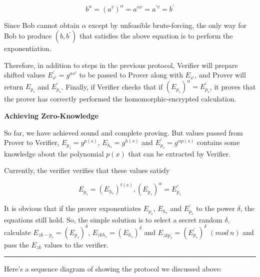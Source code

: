\documentclass[
]{report}
\begin{document}
\[b^{\alpha} = \left( a^{v} \right)^{\alpha} = a^{\alpha v} = a^{'v} = b^{'}\]

Since Bob cannot obtain \(\alpha\) except by unfeasible brute-forcing,
the only way for Bob to produce \(\left( b,b^{'} \right)\) that
satisfies the above equation is to perform the exponentiation.

Therefore, in addition to steps in the previous protocol, Verifier will
prepare shifted values \(E_{s^{i}}^{'} = g^{\alpha s^{i}}\) to be passed
to Prover along with \(E_{s^{i}}\), and Prover will return \(E_{p_{s}}\)
and \(E_{p_{s}}^{'}\). Finally, if Verifier checks that if
\(\left( E_{p_{s}} \right)^{\alpha} = E_{p_{s}}^{'}\), it proves that
the prover has correctly performed the homomorphic-encrypted
calculation.

\textbf{Achieving Zero-Knowledge}

So far, we have achieved sound and complete proving. But values passed
from Prover to Verifier, \(E_{p_{s}} = g^{p(s)}\),
\(E_{h_{s}} = g^{h(s)}\) and \(E_{p_{s}}^{'} = g^{\alpha p(s)}\)
contains some knowledge about the polynomial \(p(x)\) that can be
extracted by Verifier.

Currently, the verifier verifies that these values satisfy

\[E_{p_{s}} = \left( E_{h_{s}} \right)^{t(s)},\left( E_{p_{s}} \right)^{\alpha} = E_{p_{s}}^{'}\]

It is obvious that if the prover exponentiates \(E_{p_{s}}\),
\(E_{h_{s}}\) and \(E_{p_{s}}^{'}\) to the power \(\delta\), the
equations still hold. So, the simple solution is to select a secret
random \(\delta\), calculate
\(E_{zk - p_{s}} = \left( E_{p_{s}} \right)^{\delta}\),
\(E_{zkh_{s}} = \left( E_{h_{s}} \right)^{\delta}\) and
\(E_{zkp_{s}^{'}} = \left( E_{p_{s}}^{'} \right)^{\delta}\) \((mod\ n)\)
and pass the \(E_{zk}\) values to the verifier.

\begin{center}\rule{0.5\linewidth}{0.5pt}\end{center}

Here's a sequence diagram of showing the protocol we discussed
above:
\end{document}
